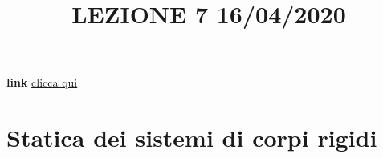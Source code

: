 \title{LEZIONE 7 16/04/2020}\newline
\textbf{link} \href{https://web.microsoftstream.com/video/16847746-6bdf-4d6b-bcbb-e5829a862801}{clicca qui}
\section{Statica dei sistemi di corpi rigidi}
